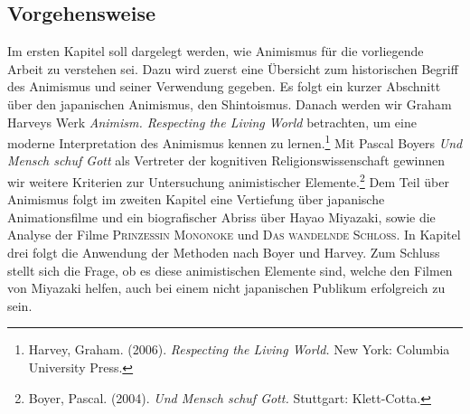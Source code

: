 \subsection*{Vorgehensweise}
Im ersten Kapitel soll dargelegt werden, wie Animismus für die vorliegende Arbeit zu verstehen sei. Dazu wird zuerst eine Übersicht zum historischen Begriff des Animismus und seiner Verwendung gegeben. Es folgt ein kurzer Abschnitt über den japanischen Animismus, den Shintoismus. Danach werden wir Graham Harveys Werk \emph{Animism. Respecting the Living World} betrachten, um eine mo\-derne Interpretation des Animismus kennen zu lernen.\footnote{Harvey, Graham. (2006). \emph{Respecting the Living World.} New York: Columbia University Press.} Mit Pascal Boyers \emph{Und Mensch schuf Gott} als Vertreter der kognitiven Religionswissenschaft gewinnen wir weitere Kriterien zur Untersuchung animistischer Elemente.\footnote{Boyer, Pascal. (2004). \emph{Und Mensch schuf Gott.} Stuttgart: Klett-Cotta.} Dem Teil über Animismus folgt im zweiten Kapitel eine Vertiefung über japanische Animationsfilme und ein biografischer Abriss über Hayao Miyazaki, sowie die Analyse der Filme \textsc{Prinzessin Mononoke} und \textsc{Das wandelnde Schloss}. In Kapitel drei folgt die Anwendung der Methoden nach Boyer und Harvey. Zum Schluss stellt sich die Frage, ob es diese animistischen Elemente sind, welche den Filmen von Miyazaki helfen, auch bei einem nicht japanischen Publikum erfolgreich zu sein.